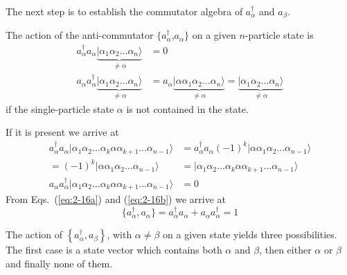 \documentclass[graybox,sectrefs,envcountresetchap,open=right]{svmonodo}
\begin{document}
The next step is to establish the  commutator algebra of $a_\alpha^{\dagger}$ and
$a_\beta$. 



The action of the anti-commutator 
$\{a_\alpha^{\dagger}$,$a_\alpha\}$ on a given $n$-particle state is
\begin{align}
	a_\alpha^{\dagger} a_\alpha \underbrace{|\alpha_1\alpha_2 \dots \alpha_{n}\rangle}_{\neq \alpha} &= 0 \nonumber \\
	a_\alpha a_\alpha^{\dagger} \underbrace{|\alpha_1\alpha_2 \dots \alpha_{n}\rangle}_{\neq \alpha} &=
	a_\alpha \underbrace{|\alpha \alpha_1\alpha_2 \dots \alpha_{n}\rangle}_{\neq \alpha} = 
	\underbrace{|\alpha_1\alpha_2 \dots \alpha_{n}\rangle}_{\neq \alpha} \label{eq:2-16a}
\end{align}
if the single-particle state $\alpha$ is not contained in the state.




 If it is present
we arrive at
\begin{align}
	a_\alpha^{\dagger} a_\alpha |\alpha_1\alpha_2 \dots \alpha_{k}\alpha \alpha_{k+1} \dots \alpha_{n-1}\rangle &=
	a_\alpha^{\dagger} a_\alpha (-1)^k |\alpha \alpha_1\alpha_2 \dots \alpha_{n-1}\rangle \nonumber \\
	= (-1)^k |\alpha \alpha_1\alpha_2 \dots \alpha_{n-1}\rangle &=
	|\alpha_1\alpha_2 \dots \alpha_{k}\alpha \alpha_{k+1} \dots \alpha_{n-1}\rangle \nonumber \\
	a_\alpha a_\alpha^{\dagger}|\alpha_1\alpha_2 \dots \alpha_{k}\alpha \alpha_{k+1} \dots \alpha_{n-1}\rangle &= 0 \label{eq:2-16b}
\end{align}
From Eqs.~(\ref{eq:2-16a}) and  (\ref{eq:2-16b}) we arrive at 
\begin{equation}
	\{a_\alpha^{\dagger} , a_\alpha \} = a_\alpha^{\dagger} a_\alpha + a_\alpha a_\alpha^{\dagger} = 1 \label{eq:2-17}
\end{equation}




The action of $\left\{a_\alpha^{\dagger}, a_\beta\right\}$, with 
$\alpha \ne \beta$ on a given state yields three possibilities. 
The first case is a state vector which contains both $\alpha$ and $\beta$, then either 
$\alpha$ or $\beta$ and finally none of them.
\end{document}
